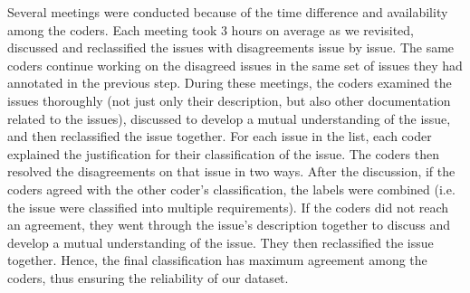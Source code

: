   Several meetings were conducted because of the time difference and availability among the coders. Each meeting took 3 hours on average as we revisited, discussed and reclassified the issues with disagreements issue by issue. The same coders continue working on the disagreed issues in the same set of issues they had annotated in the previous step. During these meetings, the coders examined the issues thoroughly (not just only their description, but also other documentation related to the issues), discussed to develop a mutual understanding of the issue, and then reclassified the issue together. For each issue in the list, each coder explained the justification for their classification of the issue. The coders then resolved the disagreements on that issue in two ways. After the discussion, if the coders agreed with the other coder's classification, the labels were combined (i.e. the issue were classified into multiple requirements). If the coders did not reach an agreement, they went through the issue's description together to discuss and develop a mutual understanding of the issue. They then reclassified the issue together. Hence, the final classification has maximum agreement among the coders, thus ensuring the reliability of our dataset. 

